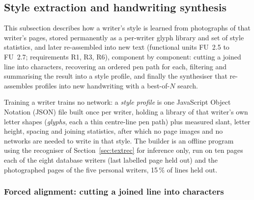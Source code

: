 
\subsection{Style extraction and handwriting synthesis}
\label{sec:styleprofile}
\label{sec:synthesis}

This subsection describes how a writer's style is learned from photographs of that writer's pages, stored permanently as a per-writer glyph library and set of style statistics, and later re-assembled into new text (functional units FU~2.5 to FU~2.7; requirements R1, R3, R6), component by component: cutting a joined line into characters, recovering an ordered pen path for each, filtering and summarising the result into a style profile, and finally the synthesiser that re-assembles profiles into new handwriting with a best-of-$N$ search.

Training a writer trains no network: a \emph{style profile} is one JavaScript Object Notation (JSON) file built once per writer, holding a library of that writer's own letter shapes (\emph{glyphs}, each a thin centre-line pen path) plus measured slant, letter height, spacing and joining statistics, after which no page images and no networks are needed to write in that style. The builder is an offline program using the recogniser of Section~\ref{sec:textrec} for inference only, run on ten pages each of the eight database writers (last labelled page held out) and the photographed pages of the five personal writers, 15\,\% of lines held out.

\subsubsection{Forced alignment: cutting a joined line into characters}
\label{sec:sty-forced}

